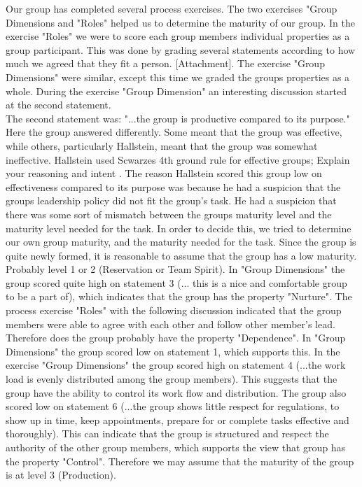 Our group has completed several process exercises. The two exercises "Group Dimensions and "Roles" helped us to determine the  maturity of our group. In the exercise "Roles" we were to score each group members individual properties as a group participant. This was done by grading several statements according to how much we agreed that they fit a person. [Attachment]. The exercise "Group Dimensions" were similar, except this time we graded the groups properties as a whole. During the exercise "Group Dimension" an interesting discussion started at the second statement. 
\\
The second statement was: "...the group is productive compared to its purpose." Here the group answered differently. Some meant that the group was effective, while others, particularly Hallstein, meant that the group was somewhat ineffective. Hallstein used Scwarzes 4th ground rule for effective groups; Explain your reasoning and intent \cite{EffectiveGroups}. The reason Hallstein scored this group low on effectiveness compared to its purpose was because he had a suspicion that the groups leadership policy did not fit the group's task. He had a suspicion that there was some sort of mismatch between the groups maturity level and the maturity level needed for the task. In order to decide this, we tried to determine our own group maturity, and the maturity needed for the task.  
	Since the group is quite newly formed, it is reasonable to assume that the group has a low maturity. Probably level 1 or 2 (Reservation or Team Spirit). In "Group Dimensions" the group scored quite high on statement 3 (... this is a nice and comfortable group to be a part of), which indicates that the group has the property "Nurture". The process exercise "Roles" with the following discussion indicated that the group members were able to agree with each other and follow other member's lead. Therefore does the group probably have the property "Dependence". In "Group Dimensions" the group scored low on statement 1, which supports this. 
	In the exercise "Group Dimensions" the group scored high on statement 4 (...the work load is evenly distributed among the group members). This suggests that the group have the ability to control its work flow and distribution. The group also scored low on statement 6 (...the group shows little respect for regulations, to show up in time, keep appointments, prepare for or complete tasks effective and thoroughly). This can indicate that the group is structured and respect the authority of the other group members, which supports the view that group has the property "Control". Therefore we may assume that the maturity of the group is at level 3 (Production).
